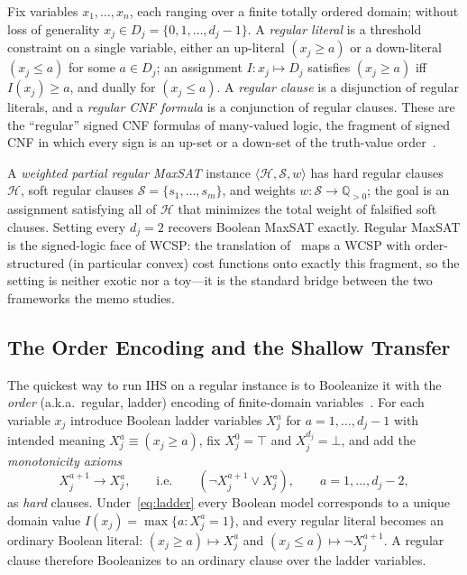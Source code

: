 Fix variables $x_1,\dots,x_n$, each ranging over a finite totally ordered
domain; without loss of generality $x_j \in D_j = \{0,1,\dots,d_j-1\}$. A
\emph{regular literal} is a threshold constraint on a single variable, either
an up-literal $(x_j \ge a)$ or a down-literal $(x_j \le a)$ for some
$a \in D_j$; an assignment $I : x_j \mapsto D_j$ satisfies $(x_j \ge a)$ iff
$I(x_j) \ge a$, and dually for $(x_j \le a)$. A \emph{regular clause} is a
disjunction of regular literals, and a \emph{regular CNF formula} is a
conjunction of regular clauses. These are the ``regular'' signed CNF formulas
of many-valued logic, the fragment of signed CNF in which every sign is an
up-set or a down-set of the truth-value order~\citep{beckert2000signed}.

A \emph{weighted partial regular MaxSAT} instance $\langle \mathcal{H},
\mathcal{S}, w\rangle$ has hard regular clauses~$\mathcal{H}$, soft regular
clauses $\mathcal{S} = \{s_1,\dots,s_m\}$, and weights
$w : \mathcal{S} \to \mathbb{Q}_{>0}$; the goal is an assignment satisfying all
of $\mathcal{H}$ that minimizes the total weight of falsified soft clauses.
Setting every $d_j = 2$ recovers Boolean MaxSAT exactly. Regular MaxSAT is the
signed-logic face of WCSP: the translation of~\citet{ansotegui2007logic} maps a
WCSP with order-structured (in particular convex) cost functions onto exactly
this fragment, so the setting is neither exotic nor a toy---it is the standard
bridge between the two frameworks the memo studies.

\subsection{The Order Encoding and the Shallow Transfer}
\label{sec:regular-enc}

The quickest way to run IHS on a regular instance is to Booleanize it with the
\emph{order} (a.k.a.\ regular, ladder) encoding of finite-domain
variables~\citep{ansotegui2004mapping}. For each variable $x_j$ introduce
Boolean ladder variables $X_j^a$ for $a = 1,\dots,d_j-1$ with intended meaning
$X_j^a \equiv (x_j \ge a)$, fix $X_j^0 = \top$ and $X_j^{d_j} = \bot$, and add
the \emph{monotonicity axioms}
\begin{equation}
X_j^{a+1} \to X_j^{a}, \qquad\text{i.e.}\qquad (\neg X_j^{a+1} \vee X_j^{a}),
\qquad a = 1,\dots,d_j-2,
\label{eq:ladder}
\end{equation}
as \emph{hard} clauses. Under~\eqref{eq:ladder} every Boolean model corresponds
to a unique domain value $I(x_j) = \max\{a : X_j^a = 1\}$, and every regular
literal becomes an ordinary Boolean literal: $(x_j \ge a) \mapsto X_j^a$ and
$(x_j \le a) \mapsto \neg X_j^{a+1}$. A regular clause therefore Booleanizes to
an ordinary clause over the ladder variables.

